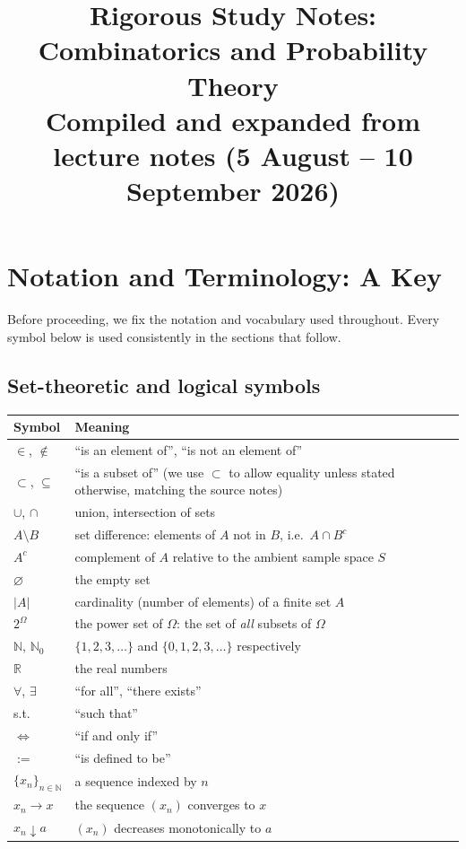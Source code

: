 \documentclass[11pt]{article}
\title{\textbf{Rigorous Study Notes: Combinatorics and Probability Theory}\\
\large Compiled and expanded from lecture notes (5 August -- 10 September 2026)}
\author{}
\date{}
\theoremstyle{definition}
\theoremstyle{plain}
\theoremstyle{remark}
\newcommand{\N}{\mathbb{N}}
\begin{document}
\maketitle
\tableofcontents
\newpage

\section{Notation and Terminology: A Key}

Before proceeding, we fix the notation and vocabulary used throughout. Every symbol below is used consistently in the sections that follow.

\subsection{Set-theoretic and logical symbols}

\begin{center}
\renewcommand{\arraystretch}{1.3}
\begin{longtable}{p{2.7cm} p{11.5cm}}
\toprule
\textbf{Symbol} & \textbf{Meaning} \\
\midrule
$\in$, $\notin$ & ``is an element of'', ``is not an element of'' \\
$\subset$, $\subseteq$ & ``is a subset of'' (we use $\subset$ to allow equality unless stated otherwise, matching the source notes) \\
$\cup$, $\cap$ & union, intersection of sets \\
$A \setminus B$ & set difference: elements of $A$ not in $B$, i.e.\ $A \cap B^c$ \\
$A^c$ & complement of $A$ relative to the ambient sample space $S$ \\
$\varnothing$ & the empty set \\
$|A|$ & cardinality (number of elements) of a finite set $A$ \\
$2^{\Omega}$ & the power set of $\Omega$: the set of \emph{all} subsets of $\Omega$ \\
$\mathbb{N}$, $\mathbb{N}_0$ & $\{1,2,3,\dots\}$ and $\{0,1,2,3,\dots\}$ respectively \\
$\mathbb{R}$ & the real numbers \\
$\forall$, $\exists$ & ``for all'', ``there exists'' \\
s.t. & ``such that'' \\
$\iff$ & ``if and only if'' \\
$:=$ & ``is defined to be'' \\
$\{x_n\}_{n\in\N}$ & a sequence indexed by $n$ \\
$x_n \to x$ & the sequence $(x_n)$ converges to $x$ \\
$x_n \downarrow a$ & $(x_n)$ decreases monotonically to $a$ \\
\bottomrule
\end{longtable}
\end{center}
\end{document}

